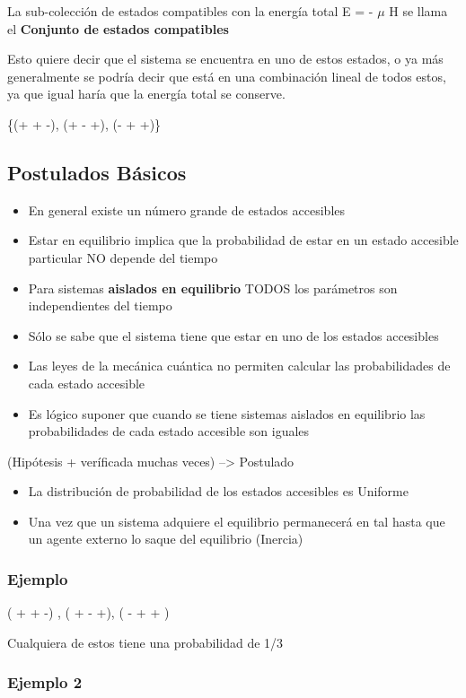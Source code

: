 \documentclass[11pt]{article}
\begin{document}
La sub-colección de estados compatibles con la energía total E = - $\mu$
H se llama el \textbf{Conjunto de estados compatibles}

Esto quiere decir que el sistema se encuentra en uno de estos estados,
o ya más generalmente se podría decir que está en una combinación
lineal de todos estos, ya que igual haría que la energía total se
conserve.

\{(+ + -), (+ - +), (- + +)\}

\subsection{Postulados Básicos}
\label{sec-1-3}
\begin{itemize}
\item En general existe un número grande de estados accesibles
\item Estar en equilibrio implica que la probabilidad de estar en un
estado accesible particular NO depende del tiempo
\item Para sistemas \textbf{aislados en equilibrio} TODOS los parámetros son
independientes del tiempo
\item Sólo se sabe que el sistema tiene que estar en uno de los estados
accesibles
\item Las leyes de la mecánica cuántica no permiten calcular las
probabilidades de cada estado accesible
\item Es lógico suponer que cuando se tiene sistemas aislados en
equilibrio las probabilidades de cada estado accesible son iguales
\end{itemize}

(Hipótesis  + veríficada muchas veces) --> Postulado

\begin{itemize}
\item La distribución de probabilidad de los estados accesibles es Uniforme
\item Una vez que un sistema adquiere el equilibrio permanecerá en tal hasta
que un agente externo lo saque del equilibrio (Inercia)
\end{itemize}
\subsubsection{Ejemplo}
\label{sec-1-3-1}

( + + -) ,  ( + - +), ( - + + )

Cualquiera de estos tiene una probabilidad de 1/3
\subsubsection{Ejemplo 2}
\label{sec-1-3-2}
\end{document}

